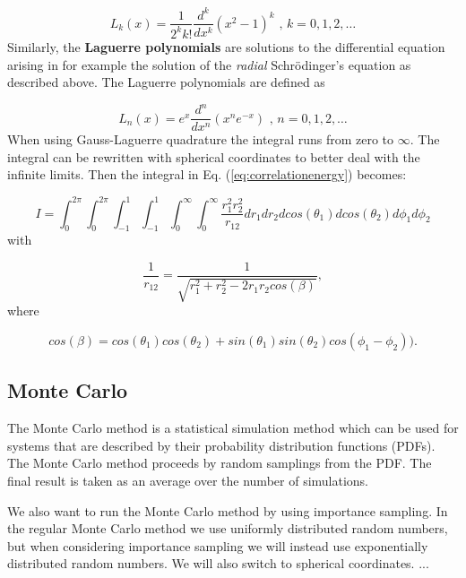 \documentclass{article}
\begin{document}
\begin{multicols}{2}
\begin{equation}
	L_k(x) = \frac{1}{2^k k!} \frac{d^k}{dx^k} (x^2 - 1)^k \textrm{ , } k = 0,1,2, \dots
\end{equation}
Similarly, the \textbf{Laguerre polynomials} are solutions to the differential equation arising in for example the solution of the \textit{radial} Schr\"{o}dinger's equation as described above. The Laguerre polynomials are defined as

\begin{equation}
	L_n(x) = e^x \frac{d^n}{dx^n} (x^n e^{-x}) \textrm{ , } n = 0,1,2, \dots
\end{equation}
When using Gauss-Laguerre quadrature the integral runs from zero to $\infty$. The integral can be rewritten with spherical coordinates to better deal with the infinite limits. Then the integral in Eq. (\ref{eq:correlationenergy}) becomes:

\begin{equation}
	I = \int_0^{2\pi} \int_0^{2\pi}  \int_{-1}^1 \int_{-1}^1   \int_0^{\infty} \int_0^{\infty}    \frac{r_1^2 r_2^2}{r_{12}} dr_1  dr_2 dcos(\theta_1)dcos(\theta_2)d\phi_1d\phi_2
\end{equation}
with

\begin{equation*}
\frac{1}{r_{12}}= \frac{1}{\sqrt{r_1^2+r_2^2-2r_1r_2cos(\beta)}},
\end{equation*}
where

\begin{equation*}
cos(\beta) = cos(\theta_1)cos(\theta_2)+sin(\theta_1)sin(\theta_2)cos(\phi_1-\phi_2)).
\end{equation*}



\subsection{Monte Carlo}
The Monte Carlo method is a statistical simulation method which can be used for systems that are described by their probability distribution functions (PDFs). The Monte Carlo method proceeds by random samplings from the PDF. The final result is taken as an average over the number of simulations.

We also want to run the Monte Carlo method by using importance sampling. In the regular Monte Carlo method we use uniformly distributed random numbers, but when considering importance sampling we will instead use exponentially distributed random numbers. We will also switch to spherical coordinates.
... 



\end{multicols}
\end{document}
